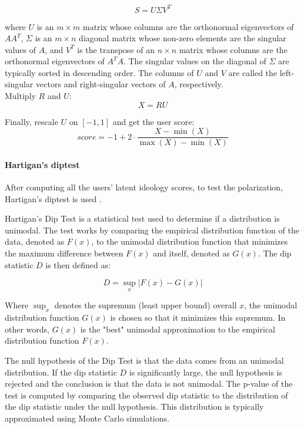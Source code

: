 \begin{equation}
S = U\Sigma V^T
\end{equation}

where $U$ is an $m \times m$ matrix whose columns are the orthonormal eigenvectors of $AA^T$, $\Sigma$ is an $m \times n$ diagonal matrix whose non-zero elements are the singular values of $A$, and $V^T$ is the transpose of an $n \times n$ matrix whose columns are the orthonormal eigenvectors of $A^T A$. The singular values on the diagonal of $\Sigma$ are typically sorted in descending order. The columns of $U$ and $V$ are called the left-singular vectors and right-singular vectors of $A$, respectively.
\\

Multiply $R$ and $U$:
\begin{equation}
X = R U
\end{equation}

Finally, rescale $U$ on $[-1,1]$ and get the user score:
\begin{equation}
score = -1 + 2 \cdot \frac{{X} - \min(X)}{\max(X) - \min(X)}
\end{equation}








\paragraph{Hartigan's diptest}

After computing all the users' latent ideology scores, to test the polarization,   Hartigan's diptest is used \cite{hartigan_dip_1985}.

Hartigan's Dip Test is a statistical test used to determine if a distribution is unimodal. The test works by comparing the empirical distribution function of the data, denoted as $F(x)$, to the unimodal distribution function that minimizes the maximum difference between $F(x)$ and itself, denoted as $G(x)$. The dip statistic $D$ is then defined as:

\begin{equation}
D = \sup_x |F(x) - G(x)|
\end{equation}

Where $\sup_x$ denotes the supremum (least upper bound) overall $x$, the unimodal distribution function $G(x)$ is chosen so that it minimizes this supremum. In other words, $G(x)$ is the "best" unimodal approximation to the empirical distribution function $F(x)$.

The null hypothesis of the Dip Test is that the data comes from an unimodal distribution. If the dip statistic $D$ is significantly large, the null hypothesis  is rejected and the conclusion is that the data is not unimodal. The p-value of the test is computed by comparing the observed dip statistic to the distribution of the dip statistic under the null hypothesis. This distribution is typically approximated using Monte Carlo simulations.